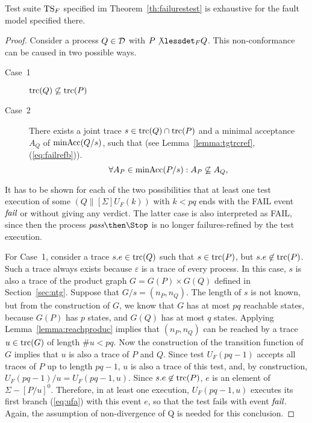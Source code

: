 \begin{lemma}\label{lemma:mainfexhaustive}
Test suite ${\text{TS}}_F$ specified im Theorem~\ref{th:failurestest} is exhaustive for the fault 
model specified there.
\end{lemma}
\begin{proof}
Consider a process $Q\in{\cal D}$ with
$P\not\lessdet_F Q$. This non-conformance can be caused in two possible ways.
\begin{description}
\item[Case~1] $\text{trc}(Q)\not\subseteq \text{trc}(P)$
\item[Case~2] There exists a joint trace $s\in\text{trc}(Q)\cap\text{trc}(P)$ and a minimal acceptance $A_Q$
of $\text{minAcc}(Q/s)$, such that
(see Lemma~\ref{lemma:tgtrcref}, (\ref{eq:failrefb})).
\begin{equation}
\label{eq:accsnotcontained}
\forall A_P\in\text{minAcc}(P/s): A_P\not\subseteq A_Q,
\end{equation}
\end{description}
It has to be shown for each of the two possibilities that at least one test
execution of some $(Q\parallel[\Sigma] U_F(k))$ with $k < pq$ ends with the
FAIL event ${\text{\it fail}}$ or without giving any verdict. The latter case is also
interpreted  as FAIL, since then the process $\epass\then\Stop$ is no longer
failures-refined by the test execution.

For Case~1, consider a  trace $s.e\in\text{trc}(Q)$ such that
$s\in\text{trc}(P)$, but $s.e\not\in\text{trc}(P)$. Such a trace always exists because
$\varepsilon$ is a trace of every process. In this case, $s$ is also a trace
of the product graph $G = G(P)\times G(Q)$ defined in Section~\ref{sec:ntg}.
Suppose that $G/s = (n_P,n_Q)$.
The length of $s$ is not known, but 
from the construction of $G$,  we know that $G$ has at most
$pq$ reachable states, because $G(P)$ has $p$ states, and $G(Q)$ has at most
$q$ states.  Applying
Lemma~\ref{lemma:reachproduc} implies that $(n_P,n_Q)$ can be reached by a trace
$u\in\text{trc}(G)$ of length $\#u < pq$. Now the construction of the transition
function of $G$ implies that $u$ is also a trace of $P$ and $Q$. Since test
$U_F(pq-1)$ accepts all traces of $P$ up to length $pq-1$, $u$ is also a
trace of this test, and, by construction, $U_F(pq-1)/u = U_F(pq-1,u)$. Since
$s.e\not\in\text{trc}(P)$, $e$ is an element of $\Sigma-[P/u]^0$. Therefore, in at
least one execution, $U_F(pq-1,u)$ executes its first branch (\ref{eq:ufa})
with this event $e$, so that the test fails with event ${\text{\it fail}}$. Again, the
assumption of non-divergence of Q is needed for this conclusion. 


\end{proof}
